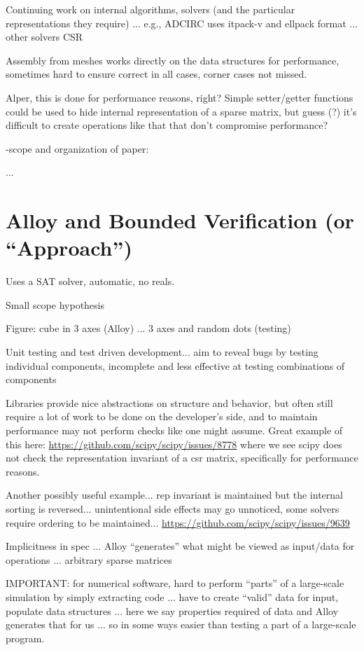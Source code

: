 \documentclass{article}
\begin{document}
Continuing work on internal algorithms, solvers (and the particular
representations they require) ... e.g., ADCIRC uses itpack-v and
ellpack format ... other solvers CSR

Assembly from meshes works directly on the data structures for
performance, sometimes hard to ensure correct in all cases, corner
cases not missed.

{\color{red} Alper, this is done for performance reasons, right?
  Simple setter/getter functions could be used to hide internal
  representation of a sparse matrix, but guess (?) it's difficult to
  create operations like that that don't compromise performance?}

-scope and organization of paper:

...

\section{Alloy and Bounded Verification (or ``Approach'')}

Uses a SAT solver, automatic, no reals.

Small scope hypothesis

Figure: cube in 3 axes (Alloy) ... 3 axes and random dots (testing)

\cbstart
Unit testing and test driven development... aim to reveal bugs by testing individual components, incomplete and less effective at testing combinations of components

Libraries provide nice abstractions on structure and behavior, but often still require a lot of work to be done on the developer's side, and to maintain performance may not perform checks like one might assume. Great example of this here: \url{https://github.com/scipy/scipy/issues/8778} where we see scipy does not check the representation invariant of a csr matrix, specifically for performance reasons.

Another possibly useful example... rep invariant is maintained but the internal sorting is reversed... unintentional side effects may go unnoticed, some solvers require ordering to be maintained... \url{https://github.com/scipy/scipy/issues/9639}
\cbend

Implicitness in spec ... Alloy ``generates'' what might be viewed as
input/data for operations ... arbitrary sparse matrices

IMPORTANT: for numerical software, hard to perform ``parts''
of a large-scale simulation by simply extracting code ... have to
create ``valid'' data for input, populate data structures ... here we
say properties required of data and Alloy generates that for us ... so
in some ways easier than testing a part of a large-scale program.
\end{document}
